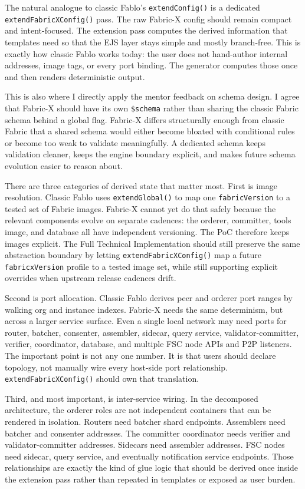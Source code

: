 The natural analogue to classic Fablo's \texttt{extendConfig()} is a dedicated \texttt{extendFabricXConfig()} pass. The raw Fabric-X config should remain compact and intent-focused. The extension pass computes the derived information that templates need so that the EJS layer stays simple and mostly branch-free. This is exactly how classic Fablo works today: the user does not hand-author internal addresses, image tags, or every port binding. The generator computes those once and then renders deterministic output.

This is also where I directly apply the mentor feedback on schema design. I agree that Fabric-X should have its own \texttt{\$schema} rather than sharing the classic Fabric schema behind a global flag. Fabric-X differs structurally enough from classic Fabric that a shared schema would either become bloated with conditional rules or become too weak to validate meaningfully. A dedicated schema keeps validation cleaner, keeps the engine boundary explicit, and makes future schema evolution easier to reason about.

There are three categories of derived state that matter most. First is image resolution. Classic Fablo uses \texttt{extendGlobal()} to map one \texttt{fabricVersion} to a tested set of Fabric images. Fabric-X cannot yet do that safely because the relevant components evolve on separate cadences: the orderer, committer, tools image, and database all have independent versioning. The PoC therefore keeps images explicit. The Full Technical Implementation should still preserve the same abstraction boundary by letting \texttt{extendFabricXConfig()} map a future \texttt{fabricxVersion} profile to a tested image set, while still supporting explicit overrides when upstream release cadences drift.

Second is port allocation. Classic Fablo derives peer and orderer port ranges by walking org and instance indexes. Fabric-X needs the same determinism, but across a larger service surface. Even a single local network may need ports for router, batcher, consenter, assembler, sidecar, query service, validator-committer, verifier, coordinator, database, and multiple FSC node APIs and P2P listeners. The important point is not any one number. It is that users should declare topology, not manually wire every host-side port relationship. \texttt{extendFabricXConfig()} should own that translation.

Third, and most important, is inter-service wiring. In the decomposed architecture, the orderer roles are not independent containers that can be rendered in isolation. Routers need batcher shard endpoints. Assemblers need batcher and consenter addresses. The committer coordinator needs verifier and validator-committer addresses. Sidecars need assembler addresses. FSC nodes need sidecar, query service, and eventually notification service endpoints. Those relationships are exactly the kind of glue logic that should be derived once inside the extension pass rather than repeated in templates or exposed as user burden.

